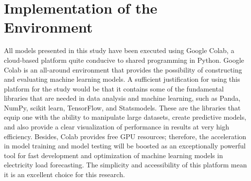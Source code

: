 \documentclass[12pt, a4paper,twoside]{report}
\theoremstyle{plain} %
\theoremstyle{definition} %
\theoremstyle{remark} %
\numberwithin{equation}{chapter}
\begin{document}
\section{Implementation of the Environment}\label{sec:3.1}
All models presented in this study have been executed using Google Colab, a cloud-based platform quite conducive to shared programming in Python. Google Colab is an all-around environment that provides the possibility of constructing and evaluating machine learning models. A sufficient justification for using this platform for the study would be that it contains some of the fundamental libraries that are needed in data analysis and machine learning, such as Panda, NumPy, scikit learn, TensorFlow, and Statsmodels. These are the libraries that equip one with the ability to manipulate large datasets, create predictive models, and also provide a clear visualization of performance in results at very high efficiency. Besides, Colab provides free GPU resources; therefore, the acceleration in model training and model testing will be boosted as an exceptionally powerful tool for fast development and optimization of machine learning models in electricity load forecasting. The simplicity and accessibility of this platform mean it is an excellent choice for this research. 
\end{document}

